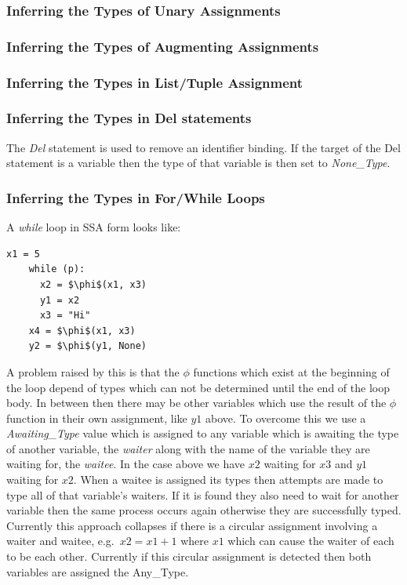 \documentclass[12pt, titlepage]{article}
\begin{document}
\subsubsection{Inferring the Types of Unary Assignments}

\subsubsection{Inferring the Types of Augmenting Assignments}

\subsubsection{Inferring the Types in List/Tuple Assignment}

\subsubsection{Inferring the Types in Del statements}
The \textit{Del} statement is used to remove an identifier binding. If the target of the Del statement is a variable then the type of that variable is then set to \textit{None\_Type}.

\subsubsection{Inferring the Types in For/While Loops}
A \textit{while} loop in SSA form looks like:
\begin{lstlisting}[mathescape]
	x1 = 5
	while (p):
	  x2 = $\phi$(x1, x3)
	  y1 = x2
	  x3 = "Hi"
	x4 = $\phi$(x1, x3)
	y2 = $\phi$(y1, None)
\end{lstlisting}
A problem raised by this is that the $\phi$ functions which exist at the beginning of the loop depend of types which can not be determined until the end of the loop body. In between then there may be other variables which use the result of the $\phi$ function in their own assignment, like $y1$ above. To overcome this we use a \textit{Awaiting\_Type} value which is assigned to any variable which is awaiting the type of another variable, the \textit{waiter} along with the name of the variable they are waiting for, the \textit{waitee}. In the case above we have $x2$ waiting for $x3$ and $y1$ waiting for $x2$. When a waitee is assigned its types then attempts are made to type all of that variable's waiters. If it is found they also need to wait for another variable then the same process occurs again otherwise they are successfully typed. Currently this approach collapses if there is a circular assignment involving a waiter and waitee, e.g.\ $x2 = x1 + 1$ where $x1$ which can cause the waiter of each to be each other. Currently if this circular assignment is detected then both variables are assigned the Any\_Type.
\end{document}
